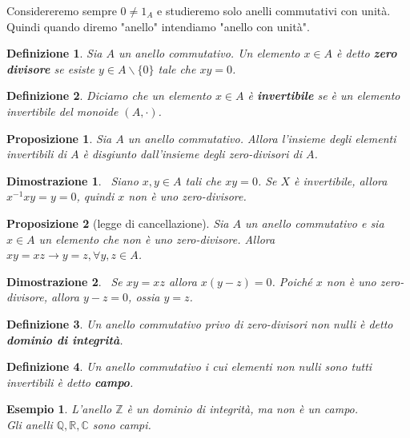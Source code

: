 \documentclass[a4paper,12pt]{article}
\theoremstyle{def}
\newtheorem*{definition}{Definizione}
\theoremstyle{prop}
\newtheorem*{proposition}{Proposizione}
\theoremstyle{esempio}
\newtheorem*{example}{Esempio}
\theoremstyle{dimostrazione}
\newtheorem*{dimostrazione}{Dimostrazione}
\theoremstyle{teo}
\theoremstyle{osservazione}
\begin{document}
Considereremo sempre \(0 \neq 1_A\) e studieremo solo anelli commutativi con unità. Quindi quando diremo "anello" intendiamo "anello con unità".

\begin{definition}
    Sia \(A\) un anello commutativo. Un elemento \(x \in A\) è detto \textbf{zero divisore} se esiste \(y \in A \backslash \{0\}\)
    tale che \(x y = 0\).
\end{definition}

\begin{definition}
    Diciamo che un elemento \(x \in A\) è \textbf{invertibile} se è un elemento invertibile del
    monoide \((A, \cdot )\).
\end{definition}

\begin{proposition}
    Sia \(A\) un anello commutativo. Allora l'insieme degli elementi invertibili di \(A\) è disgiunto
    dall'insieme degli zero-divisori di \(A\).
\end{proposition}

\begin{dimostrazione}
    \
    Siano \(x,y \in A\) tali che \(x y = 0\). Se \(X\) è invertibile, allora \(x^{-1}xy = y = 0\),
    quindi \(x\) non è uno zero-divisore.
\end{dimostrazione}

\begin{proposition}[legge di cancellazione]
    Sia \(A\) un anello commutativo e sia \(x \in A\) un elemento che non è uno zero-divisore. Allora
    \(xy=xz \rightarrow y =z , \forall y,z \in A\).
\end{proposition}

\begin{dimostrazione}
    \
    Se \(xy = xz\) allora \(x(y - z) = 0 \). Poiché \(x\) non è uno zero-divisore, allora \(y-z = 0\), ossia \(y=z\).
\end{dimostrazione}

\begin{definition}
    Un anello commutativo privo di zero-divisori non nulli è detto \textbf{dominio di integrità}.
\end{definition}

\begin{definition}
    Un anello commutativo i cui elementi non nulli sono tutti invertibili è detto \textbf{campo}.
\end{definition}

\begin{example}
    L'anello \(\mathbb{Z}\) è un dominio di integrità, ma non è un campo.\\
    Gli anelli \(\mathbb{Q} ,\mathbb{R} ,\mathbb{C} \) sono campi.
\end{example}
\end{document}
